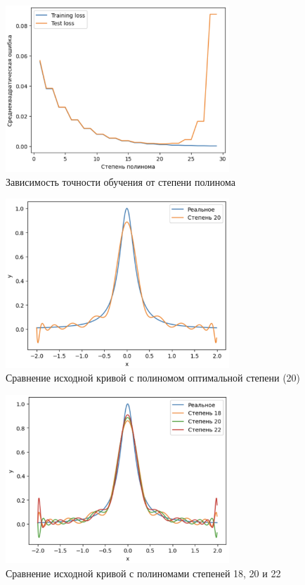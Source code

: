 \begin{figure}
	\begin{center}
		\includegraphics[width=0.75\textwidth]{images/5.png}
	\end{center}
	\caption{Зависимость точности обучения от степени полинома}
	\label{img:5}
\end{figure}

\begin{figure}
	\begin{center}
		\includegraphics[width=0.75\textwidth]{images/6.png}
	\end{center}
	\caption{Сравнение исходной кривой с полиномом оптимальной степени (20)}
	\label{img:6}
\end{figure}

\begin{figure}
	\begin{center}
		\includegraphics[width=0.75\textwidth]{images/7.png}
	\end{center}
	\caption{Сравнение исходной кривой с полиномами степеней 18, 20 и 22}
	\label{img:7}
\end{figure}

